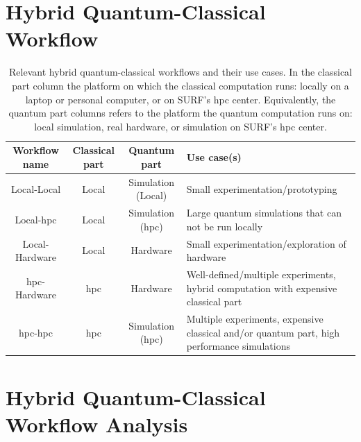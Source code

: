 \section{Hybrid Quantum-Classical Workflow}
\begin{table}[ht]
    \centering
    {\renewcommand{\arraystretch}{1.35}
        \begin{tabular}{ c|c|c|>{\centering\arraybackslash}m{4.9cm} }
            Workflow name & Classical part & Quantum part & Use case(s) \\
            \hline
            Local-Local & Local & Simulation (Local) & Small experimentation/prototyping \\
            \hline
            Local-\gls{hpc} & Local & Simulation (\gls{hpc}) & Large quantum simulations that can not be run locally \\
            \hline
            Local-Hardware & Local & Hardware & Small experimentation/exploration of hardware \\
            \hline
            \gls{hpc}-Hardware & \gls{hpc} & Hardware & Well-defined/multiple experiments, hybrid computation with expensive classical part \\
            \hline
            \gls{hpc}-\gls{hpc} & \gls{hpc} & Simulation (\gls{hpc}) & Multiple experiments, expensive classical and/or quantum part, high performance simulations \\
        \end{tabular}
    }
    \caption[Relevant hybrid quantum-classical workflows and their use cases.]{
        Relevant hybrid quantum-classical workflows and their use cases.
        In the classical part column the platform on which the classical computation runs: locally on a laptop or personal computer, or on SURF's \gls{hpc} center.
        Equivalently, the quantum part columns refers to the platform the quantum computation runs on: local simulation, real hardware, or simulation on SURF's \gls{hpc} center.
    }
    \label{table:hqca-workflows}
\end{table}

\section{Hybrid Quantum-Classical Workflow Analysis}